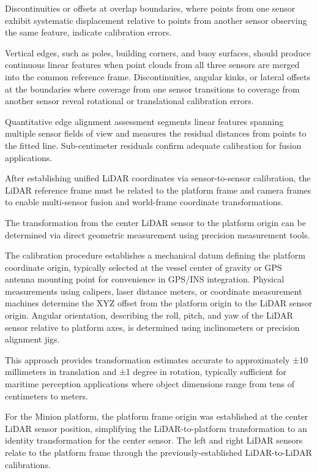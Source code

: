 \documentclass{erauthesis}
\begin{document}
Discontinuities or offsets at overlap boundaries, where points from one sensor exhibit systematic displacement relative to points from another sensor observing the same feature, indicate calibration errors.


Vertical edges, such as poles, building corners, and buoy surfaces, should produce continuous linear features when point clouds from all three sensors are merged into the common reference frame.
Discontinuities, angular kinks, or lateral offsets at the boundaries where coverage from one sensor transitions to coverage from another sensor reveal rotational or translational calibration errors.

Quantitative edge alignment assessment segments linear features spanning multiple sensor fields of view and measures the residual distances from points to the fitted line.
Sub-centimeter residuals confirm adequate calibration for fusion applications.


After establishing unified LiDAR coordinates via sensor-to-sensor calibration, the LiDAR reference frame must be related to the platform frame and camera frames to enable multi-sensor fusion and world-frame coordinate transformations.


The transformation from the center LiDAR sensor to the platform origin can be determined via direct geometric measurement using precision measurement tools.

The calibration procedure establishes a mechanical datum defining the platform coordinate origin, typically selected at the vessel center of gravity or GPS antenna mounting point for convenience in GPS/INS integration.
Physical measurements using calipers, laser distance meters, or coordinate measurement machines determine the XYZ offset from the platform origin to the LiDAR sensor origin.
Angular orientation, describing the roll, pitch, and yaw of the LiDAR sensor relative to platform axes, is determined using inclinometers or precision alignment jigs.

This approach provides transformation estimates accurate to approximately ±10 millimeters in translation and ±1 degree in rotation, typically sufficient for maritime perception applications where object dimensions range from tens of centimeters to meters.

For the Minion platform, the platform frame origin was established at the center LiDAR sensor position, simplifying the LiDAR-to-platform transformation to an identity transformation for the center sensor.
The left and right LiDAR sensors relate to the platform frame through the previously-established LiDAR-to-LiDAR calibrations.
\end{document}
